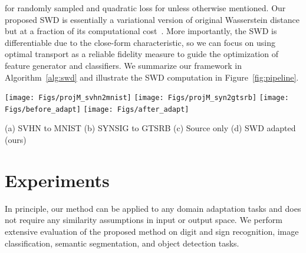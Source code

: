 \documentclass[10pt,twocolumn,letterpaper]{article}
\begin{document}
 for  randomly sampled  and quadratic loss for  unless otherwise mentioned.
Our proposed SWD is essentially a variational version of original Wasserstein distance but at a fraction of its computational cost~\cite{bonneel2015sliced}. More importantly, the SWD is differentiable due to the close-form characteristic, so we can focus on using optimal transport as a reliable fidelity measure to guide the optimization of feature generator and classifiers. 
We summarize our framework in Algorithm~\ref{alg:swd} and illustrate the SWD computation in Figure~\ref{fig:pipeline}.

\begin{figure*}
\begin{center}
\texttt{[image: Figs/projM\_svhn2mnist]}
\texttt{[image: Figs/projM\_syn2gtsrb]}
\texttt{[image: Figs/before\_adapt]}
\texttt{[image: Figs/after\_adapt]}
\end{center}
\vspace{-3mm}
\small \hspace{10mm} (a) SVHN to MNIST  \hspace{17mm} (b) SYNSIG to GTSRB \hspace{17mm} (c) Source only \hspace{13.5mm} (d) SWD adapted (ours)
\vspace{-2mm}
   \caption{The effect of number of radial projections  to accuracy on (a) SVHN to MNIST adaptation, and (b) SYNSIG to GTSRB adaptation.  is sufficient for stable optimization and good accuracies. T-SNE~\cite{maaten2008visualizing} visualization of features obtained from SVHN to MNIST experiment by (c) source domain only, and (d) SWD adaptation. Blue and red points denote the source and target samples, respectively. Our method generates much more discriminative feature representation compared to source only setting.}
\label{fig:projection}
\vspace{-2mm}
\end{figure*}




\section{Experiments}
In principle, our method can be applied to any domain adaptation tasks and does not require any similarity assumptions in input or output space. We perform extensive evaluation of the proposed method on digit and sign recognition, image classification,  semantic segmentation, and object detection tasks.
\end{document}
